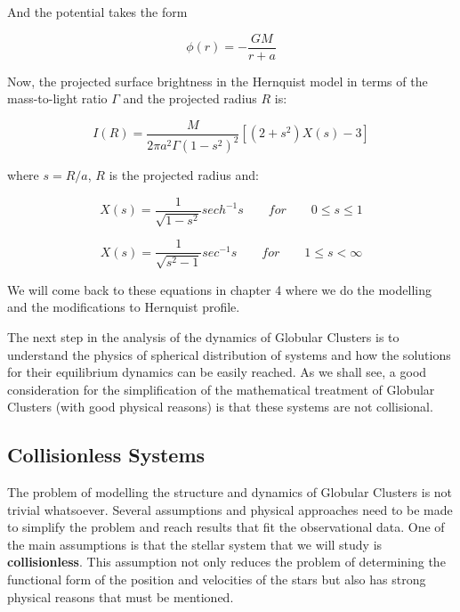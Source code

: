 And the potential takes the form

\begin{equation}
\phi(r)=-\frac{GM}{r+a}
\end{equation}

Now, the projected surface brightness in the Hernquist model in terms of the mass-to-light ratio $\Gamma$ and the projected radius $R$ is: 
 
\begin{equation}
I(R)=\frac{M}{2\pi a^{2}\Gamma\left(1-s^{2}\right)^{2}}\left[\left(2+s^{2}\right)X(s)-3\right]
\end{equation}
 
where $s=R/a$, $R$ is the projected radius and:

\begin{equation}
X(s)=\frac{1}{\sqrt{1-s^{2}}}sech^{-1}s\qquad for\qquad0\leq s\leq1
\end{equation}

\begin{equation}
X(s)=\frac{1}{\sqrt{s^{2}-1}}sec^{-1}s\qquad for\qquad1\leq s<\infty
\end{equation}

We will come back to these equations in chapter 4 where we do the modelling and the modifications to Hernquist profile.

The next step in the analysis of the dynamics of Globular Clusters is to understand the physics of spherical distribution of systems and how the solutions for their equilibrium dynamics can be easily reached. As we shall see, a good consideration for the simplification of the mathematical treatment of Globular Clusters (with good physical reasons) is that these systems are not collisional.

\subsection{Collisionless Systems}

The problem of modelling the structure and dynamics of Globular Clusters is not trivial whatsoever. Several assumptions and physical approaches need to be made to simplify the problem and reach results that fit the observational data. One of the main assumptions is that the stellar system that we will study is \textbf{collisionless}. This assumption not only reduces the problem of determining the functional form of the position and velocities of the stars but also has strong physical reasons that must be mentioned.

